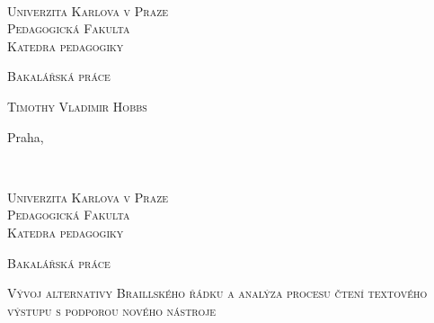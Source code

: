 \documentclass[a4paper,12pt,czech,cleardoublepage=empty]{scrreprt}
\newcommand{\SubjectCs}{Bakalářská práce}
\newcommand{\TitleCs}{Vývoj alternativy Braillského řádku a analýza procesu čtení textového výstupu s podporou nového nástroje}
\newcommand{\AuthorName}{Timothy Vladimir Hobbs}
\newcommand{\IssuedIn}{Praha}
\newcommand{\DepartmentCs}{Katedra pedagogiky}
\newcommand{\noun}[1]{\textsc{#1}}
\begin{document}
~\thispagestyle{empty}\vfill{}

\begin{center}
\vspace{10mm}
\textsf{\textsc{\noun{\LARGE Univerzita Karlova v Praze}}}\\
\vspace{0.5em}
\textsf{\textsc{\noun{\LARGE Pedagogická Fakulta}}}\\
\vspace*{1em}
\textsf{\textsc{\noun{\Large \DepartmentCs}}}\vspace{15mm}
\vspace{30mm}

\textsf{\textsc{\noun{\huge \SubjectCs}}}{\huge \par}

\vspace{15mm}


\vspace{10mm}

\textsf{\textsc{\noun{\Large \AuthorName}}}

\end{center}

\vspace*{\fill}


\vspace{10mm}

\textsf{\large \IssuedIn, \the\year}


\clearpage{}~\thispagestyle{empty}\begin{center}\vspace{10mm}


\textsf{\textsc{\noun{\LARGE Univerzita Karlova v Praze}}}\\
\vspace{0.5em}
\textsf{\textsc{\noun{\LARGE Pedagogická Fakulta}}}\\
\vspace*{1em}
\textsf{\textsc{\noun{\Large \DepartmentCs}}}\vspace{15mm}


\vspace{15mm}

\textsf{\textsc{\noun{\huge \SubjectCs}}}{\huge \par}

\vspace{15mm}


\textsf{\textsc{\noun{\LARGE \TitleCs}}}{\LARGE \par}


\vspace{10mm}


\end{center} 
\end{document}
